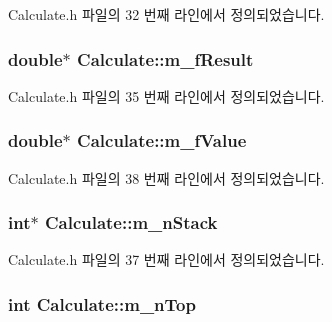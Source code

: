 Calculate.\+h 파일의 32 번째 라인에서 정의되었습니다.

\hypertarget{class_calculate_a5ffe97b9c4358acf90360d328b9144c0}{
\subsubsection[{m\+\_\+f\+Result}]{\setlength{\rightskip}{0pt plus 5cm}double$\ast$ Calculate\+::m\+\_\+f\+Result\hspace{0.3cm}{\ttfamily [protected]}}}\label{class_calculate_a5ffe97b9c4358acf90360d328b9144c0}


Calculate.\+h 파일의 35 번째 라인에서 정의되었습니다.

\hypertarget{class_calculate_a7ded18ea2282684cf9570cceadbcbf37}{
\subsubsection[{m\+\_\+f\+Value}]{\setlength{\rightskip}{0pt plus 5cm}double$\ast$ Calculate\+::m\+\_\+f\+Value\hspace{0.3cm}{\ttfamily [protected]}}}\label{class_calculate_a7ded18ea2282684cf9570cceadbcbf37}


Calculate.\+h 파일의 38 번째 라인에서 정의되었습니다.

\hypertarget{class_calculate_ae2a302680f654bfa735b1dc4f34814b6}{
\subsubsection[{m\+\_\+n\+Stack}]{\setlength{\rightskip}{0pt plus 5cm}int$\ast$ Calculate\+::m\+\_\+n\+Stack\hspace{0.3cm}{\ttfamily [protected]}}}\label{class_calculate_ae2a302680f654bfa735b1dc4f34814b6}


Calculate.\+h 파일의 37 번째 라인에서 정의되었습니다.

\hypertarget{class_calculate_a9f6afe7d8278100e1f27977aaeba0a72}{
\subsubsection[{m\+\_\+n\+Top}]{\setlength{\rightskip}{0pt plus 5cm}int Calculate\+::m\+\_\+n\+Top\hspace{0.3cm}{\ttfamily [protected]}}}\label{class_calculate_a9f6afe7d8278100e1f27977aaeba0a72}


